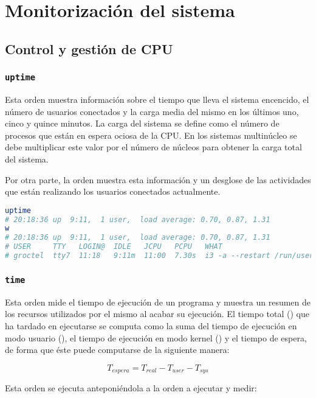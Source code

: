 \section{Monitorización del sistema}

\subsection{Control y gestión de CPU}

\subsubsection{\texttt{uptime}}

Esta orden muestra información sobre el tiempo que lleva el sistema encencido, el número de usuarios conectados y la carga media del mismo en los últimos uno, cinco y quince minutos.
La carga del sistema se define como el número de procesos que están en espera ociosa de la CPU\@.
En los sistemas multinúcleo se debe multiplicar este valor por el número de núcleos para obtener la carga total del sistema.

Por otra parte, la orden  muestra esta información y un desglose de las actividades que están realizando los usuarios conectados actualmente.

\begin{lstlisting}[language=Bash]
uptime
# 20:18:36 up  9:11,  1 user,  load average: 0.70, 0.87, 1.31
w
# 20:18:36 up  9:11,  1 user,  load average: 0.70, 0.87, 1.31
# USER     TTY   LOGIN@  IDLE   JCPU   PCPU   WHAT
# groctel  tty7  11:18   9:11m  11:00  7.30s  i3 -a --restart /run/user/1000/i3/restart-state.1608
\end{lstlisting}

\subsubsection{\texttt{time}}

Esta orden mide el tiempo de ejecución de un programa y muestra un resumen de los recursos utilizados por el mismo al acabar su ejecución.
El tiempo total () que ha tardado en ejecutarse se computa como la suma del tiempo de ejecución en modo usuario (), el tiempo de ejecución en modo kernel () y el tiempo de espera, de forma que éste puede computarse de la siguiente manera:

\[T_{espera}=T_{real}-T_{user}-T_{sys}\]

Esta orden se ejecuta anteponiéndola a la orden a ejecutar y medir:

